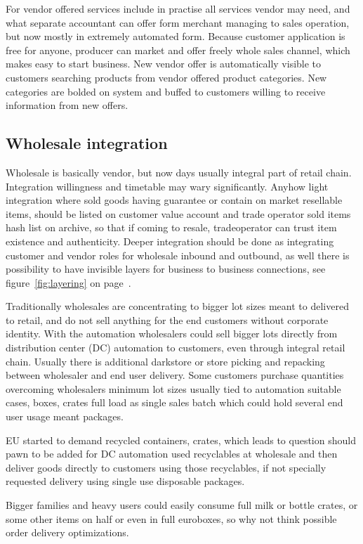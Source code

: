 For vendor offered services include in practise all services vendor may need,
and what separate accountant can offer form merchant managing to sales
operation, but now mostly in extremely automated form. Because customer
application is free for anyone, producer can market and offer freely whole
sales channel, which makes easy to start business. New vendor offer is
automatically visible to customers searching products from vendor offered
product categories. New categories are bolded on system and buffed to
customers willing to receive information from new offers.

\subsection{Wholesale integration}\label{wholesale}
Wholesale is basically vendor, but now days usually integral part of retail
chain. Integration willingness and timetable may wary significantly. Anyhow
light integration where sold goods having guarantee or contain on market
resellable items, should be listed on customer value account and trade
operator sold items hash list on archive, so that if coming to resale,
tradeoperator can trust item existence and authenticity. Deeper integration
should be done as integrating customer and vendor roles for wholesale inbound
and outbound, as well there is possibility to have invisible layers for
business to business connections, see figure~\ref{fig:layering} on
page~\pageref{fig:layering}.

Traditionally wholesales are concentrating to bigger lot sizes meant to
delivered to retail, and do not sell anything for the end customers without
corporate identity. With the automation wholesalers could sell bigger lots
directly from distribution center (DC) automation to customers, even through
integral retail chain. Usually there is additional darkstore or store picking
and repacking between wholesaler and end user delivery. Some customers
purchase quantities overcoming wholesalers minimum lot sizes usually tied to
automation suitable cases, boxes, crates full load as single sales batch which
could hold several end user usage meant packages.

EU started to demand recycled containers, crates, which leads to question
should pawn to be added for DC automation used recyclables at wholesale and
then deliver goods directly to customers using those recyclables, if not
specially requested delivery using single use disposable packages.

Bigger families and heavy users could easily consume full milk or bottle
crates, or some other items on half or even in full euroboxes, so why not
think possible order delivery optimizations.

